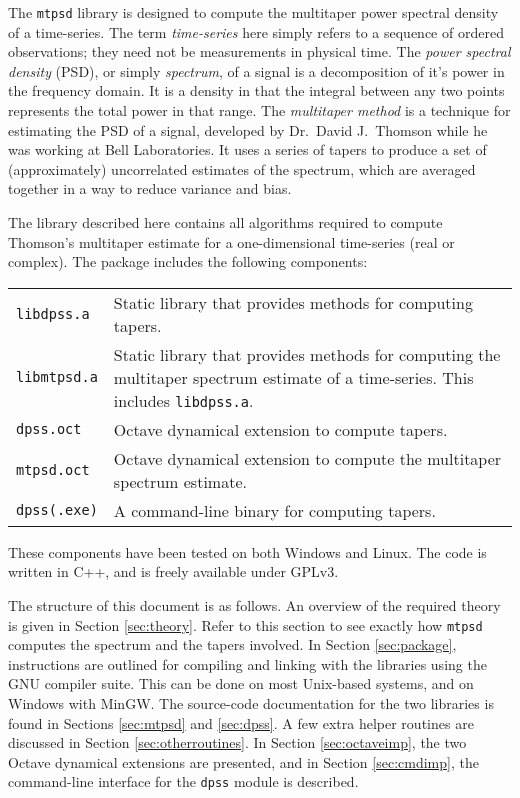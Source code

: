 The \texttt{mtpsd} library is designed to compute the multitaper power spectral density of a time-series.  The term \emph{time-series} here simply refers to a sequence of ordered observations; they need not be measurements in physical time.  The \emph{power spectral density} (PSD), or simply \emph{spectrum}, of a signal is a decomposition of it's power in the frequency domain.  It is a density in that the integral between any two points represents the total power in that range.  The \emph{multitaper method} is a technique for estimating the PSD of a signal, developed by Dr.~David J.~Thomson while he was working at Bell Laboratories.  It uses a series of tapers to produce a set of (approximately) uncorrelated estimates of the spectrum, which are averaged together in a way to reduce variance and bias.  

The library described here contains all algorithms required to compute Thomson's multitaper estimate for a one-dimensional time-series (real or complex).  The package includes the following components:
\smallskip

\noindent \begin{tabular}{@{\hspace*{4ex}}lp{\textwidth-21ex}}
    \texttt{libdpss.a} & Static library that provides methods for computing tapers.\\
    \texttt{libmtpsd.a} & Static library that provides methods for computing the multitaper spectrum estimate of a time-series.  This includes \texttt{libdpss.a}.\\
    \texttt{dpss.oct} & Octave dynamical extension to compute tapers.\\
    \texttt{mtpsd.oct} & Octave dynamical extension to compute the multitaper spectrum estimate.\\
    \texttt{dpss(.exe)} & A command-line binary for computing tapers.
\end{tabular}
\smallskip

\noindent These components have been tested on both Windows and Linux.  The code is written in C++, and is freely available under GPLv3.

The structure of this document is as follows.  An overview of the required theory is given in Section \ref{sec:theory}.  Refer to this section to see exactly how \texttt{mtpsd} computes the spectrum and the tapers involved.  In Section \ref{sec:package}, instructions are outlined for compiling and linking with the libraries using the GNU compiler suite.  This can be done on most Unix-based systems, and on Windows with MinGW.  The source-code documentation for the two libraries is found in Sections \ref{sec:mtpsd} and \ref{sec:dpss}.  A few extra helper routines are discussed in Section \ref{sec:otherroutines}.  In Section \ref{sec:octaveimp}, the two Octave dynamical extensions are presented, and in Section \ref{sec:cmdimp}, the command-line interface for the \texttt{dpss} module is described.